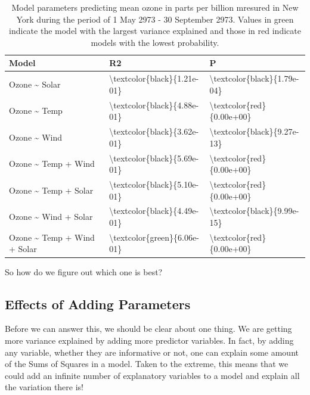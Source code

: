 \documentclass[
  letterpaper,
]{book}
\begin{document}
\begin{longtable}[t]{lll}
\caption{\label{tab:unnamed-chunk-31}Model parameters predicting mean ozone in parts per billion mresured in New York during the period of 1 May 2973 - 30 September 2973.  Values in green indicate the model with the largest variance explained and those in red indicate models with the lowest probability.}\\
\toprule
Model & R2 & P\\
\midrule
Ozone \textasciitilde{} Solar & \textbackslash{}textcolor\{black\}\{1.21e-01\} & \textbackslash{}textcolor\{black\}\{1.79e-04\}\\
Ozone \textasciitilde{} Temp & \textbackslash{}textcolor\{black\}\{4.88e-01\} & \textbackslash{}textcolor\{red\}\{0.00e+00\}\\
Ozone \textasciitilde{} Wind & \textbackslash{}textcolor\{black\}\{3.62e-01\} & \textbackslash{}textcolor\{black\}\{9.27e-13\}\\
Ozone \textasciitilde{} Temp + Wind & \textbackslash{}textcolor\{black\}\{5.69e-01\} & \textbackslash{}textcolor\{red\}\{0.00e+00\}\\
Ozone \textasciitilde{} Temp + Solar & \textbackslash{}textcolor\{black\}\{5.10e-01\} & \textbackslash{}textcolor\{red\}\{0.00e+00\}\\
\addlinespace
Ozone \textasciitilde{} Wind + Solar & \textbackslash{}textcolor\{black\}\{4.49e-01\} & \textbackslash{}textcolor\{black\}\{9.99e-15\}\\
Ozone \textasciitilde{} Temp + Wind + Solar & \textbackslash{}textcolor\{green\}\{6.06e-01\} & \textbackslash{}textcolor\{red\}\{0.00e+00\}\\
\bottomrule
\end{longtable}

So how do we figure out which one is best?

\subsection{Effects of Adding
Parameters}\label{effects-of-adding-parameters}

Before we can answer this, we should be clear about one thing. We are
getting more variance explained by adding more predictor variables. In
fact, by adding any variable, whether they are informative or not, one
can explain some amount of the Sums of Squares in a model. Taken to the
extreme, this means that we could add an infinite number of explanatory
variables to a model and explain all the variation there is!
\end{document}
